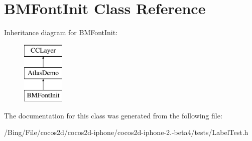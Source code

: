 \hypertarget{interface_b_m_font_init}{\section{B\-M\-Font\-Init Class Reference}
\label{interface_b_m_font_init}
}
Inheritance diagram for B\-M\-Font\-Init\-:\begin{figure}[H]
\begin{center}
\leavevmode
\includegraphics[height=3.000000cm]{interface_b_m_font_init}
\end{center}
\end{figure}


The documentation for this class was generated from the following file\-:\begin{DoxyCompactItemize}
\item 
/\-Bing/\-File/cocos2d/cocos2d-\/iphone/cocos2d-\/iphone-\/2.-\/beta4/tests/Label\-Test.\-h\end{DoxyCompactItemize}
